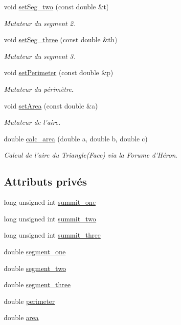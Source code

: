 \begin{DoxyCompactItemize}
void \hyperlink{class_face_a1eebfcfb41d87470d675ab8fb106585e}{set\-Seg\-\_\-two} (const double \&t)
\begin{DoxyCompactList}\small\item\em Mutateur du segment 2. \end{DoxyCompactList}\item 
void \hyperlink{class_face_acc1fc08e71b974483dc876adb43da487}{set\-Seg\-\_\-three} (const double \&th)
\begin{DoxyCompactList}\small\item\em Mutateur du segment 3. \end{DoxyCompactList}\item 
void \hyperlink{class_face_af2be08b9e991f22d85aa39901a353a53}{set\-Perimeter} (const double \&p)
\begin{DoxyCompactList}\small\item\em Mutateur du périmètre. \end{DoxyCompactList}\item 
void \hyperlink{class_face_a6ee83e39c97a515c49f076d55a14b8bd}{set\-Area} (const double \&a)
\begin{DoxyCompactList}\small\item\em Mutateur de l'aire. \end{DoxyCompactList}\item 
double \hyperlink{class_face_a0d460b44871e8f720de067063734aede}{calc\-\_\-area} (double a, double b, double c)
\begin{DoxyCompactList}\small\item\em Calcul de l'aire du Triangle(\-Face) via la Forume d'Héron. \end{DoxyCompactList}\end{DoxyCompactItemize}
\subsection*{Attributs privés}
\begin{DoxyCompactItemize}
\item 
long unsigned int \hyperlink{class_face_acaf2b92e18061912a39faabc94a8f4b6}{summit\-\_\-one}
\item 
long unsigned int \hyperlink{class_face_aa46034f67b74525862dda3452dab6f89}{summit\-\_\-two}
\item 
long unsigned int \hyperlink{class_face_ad10219db49c55f03d38533424bfa1c0c}{summit\-\_\-three}
\item 
double \hyperlink{class_face_ae4053947c53549d2fd5cf43aa9c712f4}{segment\-\_\-one}
\item 
double \hyperlink{class_face_ae79107e53090d0a7efb5070ea093a70e}{segment\-\_\-two}
\item 
double \hyperlink{class_face_a777ca579978d8d20c6e8a5e64a6999cc}{segment\-\_\-three}
\item 
double \hyperlink{class_face_a9b759ee3c90c67bc7af3969546f568f9}{perimeter}
\item 
double \hyperlink{class_face_ae63fcd017fcd355e212a2510209db17c}{area}
\end{DoxyCompactItemize}


